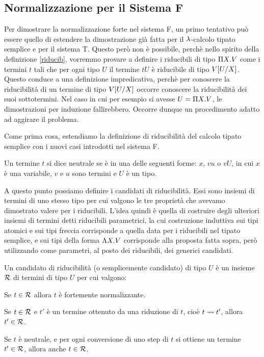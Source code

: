 \documentclass[]{marticle}
\begin{document}
\subsection{Normalizzazione per il Sistema F}
Per dimostrare la normalizzazione forte nel sistema F, un primo tentativo pu\`o
essere quello di estendere la dimostrazione gi\`a fatta per il $\l$-calcolo
tipato semplice e per il sistema T. Questo per\`o non \`e possibile, perch\`e
nello spirito della definizione \ref{riducib}, vorremmo
provare a definire i riducibili di tipo $\P X. V$ come i termini $t$ tali che
per ogni tipo $U$ il termine $tU$ \`e riducibile di tipo $V\sub{U}{X}$. Questo
conduce a una definizione impredicativa, perch\`e per conoscere la
riducibilit\`a di un termine di tipo $V\sub{U}{X}$ occorre conoscere la
riducibilit\`a dei suoi sottotermini. Nel caso in cui per esempio si avesse $U =
\P X.V$, le dimostrazioni per induzione fallirebbero. Occorre dunque un
procedimento adatto ad aggirare il problema.

Come prima cosa, estendiamo la definizione di riducibilit\`a del calcolo tipato
semplice con i nuovi casi introdotti nel sistema F.
\begin{block}[Definizione]
    Un termine $t$ si dice neutrale se \`e in una delle seguenti forme: $x$,
    $vu$ o $vU$, in cui $x$ \`e una variabile, $v$ e $u$ sono termini e $U$ \`e
    un tipo.
\end{block}

A questo punto possiamo definire i candidati di riducibilit\`a. Essi sono
insiemi di termini di uno stesso tipo per cui valgono le tre propriet\`a che
avevamo dimostrato valere per i riducibili. L'idea quindi \`e quella di
costruire degli ulteriori insiemi di termini detti riducibili parametrici, la
cui costruzione induttiva sui tipi atomici e sui tipi freccia corrisponde a
quella data per i riducibili nel tipato semplice, e sui tipi della forma $\L
X.V$ corrisponde alla proposta fatta sopra, per\`o utilizzando come parametri,
al posto dei riducibili, dei generici candidati.

\begin{block}[Definizione]
    Un candidato di riducibilit\`a (o semplicemente candidato) di tipo $U$ \`e
    un insieme $\can{R}$ di termini di tipo $U$ per cui valgono:
    \begin{nlist}[CR1]
        \item Se $t\in\can{R}$ allora $t$ \`e fortemente normalizzante.
        \item Se $t\in\can{R}$ e $t'$ \`e un termine ottenuto da una riduzione
            di $t$, cio\`e $t\reduce t'$, allora $t'\in\can{R}$.
        \item  Se $t$ \`e neutrale, e per ogni conversione di uno step di $t$ si
            ottiene un termine $t'\in\can{R}$, allora anche $t\in\can{R}$.
    \end{nlist}
\end{block}
\end{document}
